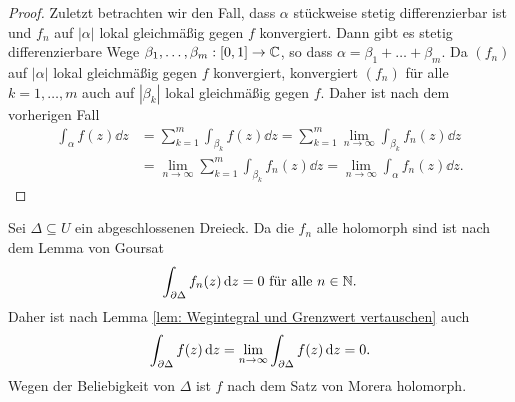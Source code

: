 \documentclass[a4paper,10pt]{article}
\begin{document}
\begin{proof}
Zuletzt betrachten wir den Fall, dass $\alpha$ stückweise stetig differenzierbar ist und $f_n$ auf $|\alpha|$ lokal gleichmäßig gegen $f$ konvergiert. Dann gibt es stetig differenzierbare Wege $\beta_1, \ldots, \beta_m : [0,1] \to \mathbb{C}$, so dass $\alpha = \beta_1 + \ldots + \beta_m$. Da $(f_n)$ auf $|\alpha|$ lokal gleichmäßig gegen $f$ konvergiert, konvergiert $(f_n)$ für alle $k = 1, \ldots, m$ auch auf $|\beta_k|$ lokal gleichmäßig gegen $f$. Daher ist nach dem vorherigen Fall
\begin{align*}
 \int_\alpha f(z) \dd{z}
 &= \sum_{k=1}^m \int_{\beta_k} f(z) \dd{z}
 = \sum_{k=1}^m \lim_{n \to \infty} \int_{\beta_k} f_n(z) \dd{z} \\
 &= \lim_{n \to \infty} \sum_{k=1}^m \int_{\beta_k} f_n(z) \dd{z}
 = \lim_{n \to \infty} \int_\alpha f_n(z) \dd{z}.
\end{align*}
\end{proof}

Sei $\Delta \subseteq U$ ein abgeschlossenen Dreieck. Da die $f_n$ alle holomorph sind ist nach dem Lemma von Goursat
\[
 \int_{\partial \Delta} f_n(z) \,\text{d}z = 0 \text{ für alle } n \in \mathbb{N}.
\]
Daher ist nach Lemma \ref{lem: Wegintegral und Grenzwert vertauschen} auch
\[
 \int_{\partial \Delta} f(z) \,\text{d}z
 = \lim_{n \to \infty} \int_{\partial \Delta} f(z) \,\text{d}z
 = 0.
\]
Wegen der Beliebigkeit von $\Delta$ ist $f$ nach dem Satz von Morera holomorph.
\end{document}
